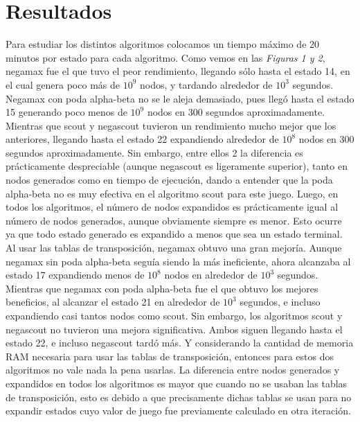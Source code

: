 \documentclass[a4paper,10pt]{article}
\begin{document}
\section*{Resultados}
  Para estudiar los distintos algoritmos colocamos un tiempo m\'aximo de 20 minutos por estado 
  para cada algoritmo. Como vemos en las \textit{Figuras 1 y 2}, negamax fue el que tuvo el peor 
  rendimiento, llegando s\'olo hasta el estado 14, en el cual genera poco m\'as de $10^9$ nodos,
  y tardando alrededor de $10^3$ segundos. Negamax con poda alpha-beta no se le aleja demasiado,
  pues lleg\'o hasta el estado 15 generando poco menos de $10^9$ nodos en $300$ segundos 
  aproximadamente. Mientras que scout y negascout tuvieron un rendimiento mucho mejor que los 
  anteriores, llegando hasta el estado 22 expandiendo alrededor de $10^8$ nodos en $300$ 
  segundos aproximadamente. Sin embargo, entre ellos 2 la diferencia es pr\'acticamente 
  despreciable (aunque negascout es ligeramente superior), tanto en nodos generados como en 
  tiempo de ejecuci\'on, dando a entender que la poda alpha-beta no es muy efectiva en el 
  algoritmo scout para este juego. Luego, en todos los algoritmos, el n\'umero de nodos 
  expandidos es pr\'acticamente igual al n\'umero de nodos generados, aunque obviamente 
  siempre es menor. Esto ocurre ya que todo estado generado es expandido a menos que sea un 
  estado terminal. \\

  Al usar las tablas de transposici\'on, negamax obtuvo una gran mejor\'ia. Aunque negamax sin 
  poda alpha-beta segu\'ia siendo la m\'as ineficiente, ahora alcanzaba al estado 17 expandiendo 
  menos de $10^8$ nodos en alrededor de $10^3$ segundos. Mientras que negamax con poda 
  alpha-beta fue el que obtuvo los mejores beneficios, al alcanzar el estado 21 en alrededor de 
  $10^3$ segundos, e incluso expandiendo casi tantos nodos como scout. Sin embargo, los 
  algoritmos scout y negascout no tuvieron una mejora significativa. Ambos siguen llegando hasta 
  el estado 22, e incluso negascout tard\'o m\'as. Y considerando la cantidad de memoria RAM 
  necesaria para usar las tablas de transposici\'on, entonces para estos dos algoritmos no vale 
  nada la pena usarlas. La diferencia entre nodos generados y expandidos en todos los algoritmos 
  es mayor que cuando no se usaban las tablas de transposici\'on, esto es debido a que precisamente 
  dichas tablas se usan para no expandir estados cuyo valor de juego fue previamente calculado en 
  otra iteraci\'on.
\end{document}
